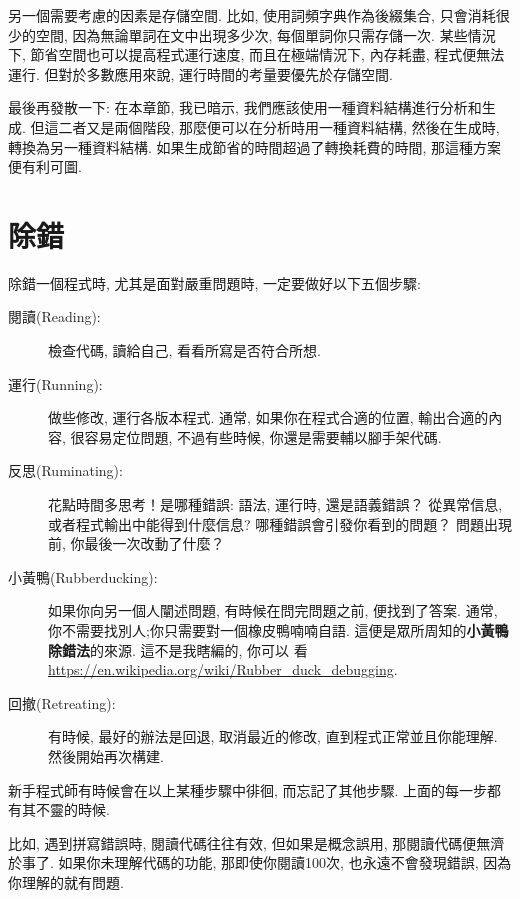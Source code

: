 \documentclass[10pt]{book}
\begin{document}
另一個需要考慮的因素是存儲空間. 
比如, 使用詞頻字典作為後綴集合, 只會消耗很少的空間, 
因為無論單詞在文中出現多少次, 每個單詞你只需存儲一次. 
某些情況下, 節省空間也可以提高程式運行速度, 而且在極端情況下, 
內存耗盡, 程式便無法運行. 但對於多數應用來說, 運行時間的考量要優先於存儲空間. 

最後再發散一下: 在本章節, 我已暗示, 我們應該使用一種資料結構進行分析和生成. 
但這二者又是兩個階段, 那麼便可以在分析時用一種資料結構, 然後在生成時, 
轉換為另一種資料結構. 如果生成節省的時間超過了轉換耗費的時間, 
那這種方案便有利可圖. 


\section{除錯}

除錯一個程式時, 尤其是面對嚴重問題時, 一定要做好以下五個步驟:

\begin{description}

\item[閱讀(Reading):] 檢查代碼, 讀給自己, 看看所寫是否符合所想. 

\item[運行(Running):] 做些修改, 運行各版本程式. 通常, 如果你在程式合適的位置, 
輸出合適的內容, 很容易定位問題, 不過有些時候, 你還是需要輔以腳手架代碼. 

\item[反思(Ruminating):] 花點時間多思考！是哪種錯誤: 語法, 運行時, 還是語義錯誤？
從異常信息, 或者程式輸出中能得到什麼信息? 哪種錯誤會引發你看到的問題？
問題出現前, 你最後一次改動了什麼？

\item[小黃鴨(Rubberducking):] 如果你向另一個人闡述問題, 有時候在問完問題之前, 
便找到了答案. 
通常, 你不需要找別人;你只需要對一個橡皮鴨喃喃自語. 
這便是眾所周知的{\bf 小黃鴨除錯法}的來源. 這不是我瞎編的, 你可以
看\url{https://en.wikipedia.org/wiki/Rubber_duck_debugging}.

\item[回撤(Retreating):] 有時候, 最好的辦法是回退, 
取消最近的修改, 直到程式正常並且你能理解. 然後開始再次構建. 

\end{description}

新手程式師有時候會在以上某種步驟中徘徊, 而忘記了其他步驟. 
上面的每一步都有其不靈的時候. 

比如, 遇到拼寫錯誤時, 閱讀代碼往往有效, 但如果是概念誤用, 那閱讀代碼便無濟於事了. 
如果你未理解代碼的功能, 那即使你閱讀100次, 也永遠不會發現錯誤, 
因為你理解的就有問題. 
\end{document}
